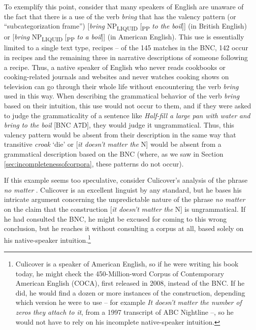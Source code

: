 To exemplify this point, consider that many speakers of English are unaware of the fact that there is a use of the verb \textit{bring} that has the valency pattern (or ``subcategorization frame'') [\textit{bring} NP\textsubscript{LIQUID} [\textsubscript{PP} \textit{to the boil}]] (in British English) or [\textit{bring} NP\textsubscript{LIQUID} [\textsubscript{PP} \textit{to a boil}]] (in American English). This use is essentially limited to a single text type, recipes -- of the 145 matches in the BNC, 142 occur in recipes and the remaining three in narrative descriptions of someone following a recipe. Thus, a native speaker of English who never reads cookbooks or cooking-related journals and websites and never watches cooking shows on television can go through their whole life without encountering the verb \textit{bring} used in this way. When describing the grammatical behavior of the verb \textit{bring} based on their intuition, this use would not occur to them, and if they were asked to judge the grammaticality of a sentence like \textit{Half-fill a large pan with water and bring to the boil} [BNC A7D], they would judge it ungrammatical. Thus, this valency pattern would be absent from their description in the same way that transitive \textit{croak} `die' or [\textit{it doesn't matter the} N] would be absent from a grammatical description based on the BNC (where, as we saw in Section \ref{sec:incompletenessofcorpora}, these patterns do not occur).

If this example seems too speculative, consider Culicover's analysis of the phrase \textit{no matter} \citep[106f.]{culicover_syntactic_1999}. Culicover is an excellent linguist by any standard, but he bases his intricate argument concerning the unpredictable nature of the phrase \textit{no matter} on the claim that the construction [\textit{it doesn't matter the} N] is ungrammatical. If he had consulted the BNC, he might be excused for coming to this wrong conclusion, but he reaches it without consulting a corpus at all, based solely on his native-speaker intuition.\footnote{Culicover is a speaker of American English, so if he were writing his book today, he might check the 450-Million-word Corpus of Contemporary American English (COCA), first released in 2008, instead of the BNC. If he did, he would find a dozen or more instances of the construction, depending which version he were to use -- for example \textit{It doesn't matter the number of zeros they attach to it}, from a 1997 transcript of ABC Nightline --, so he would not have to rely on his incomplete native-speaker intuition.}

